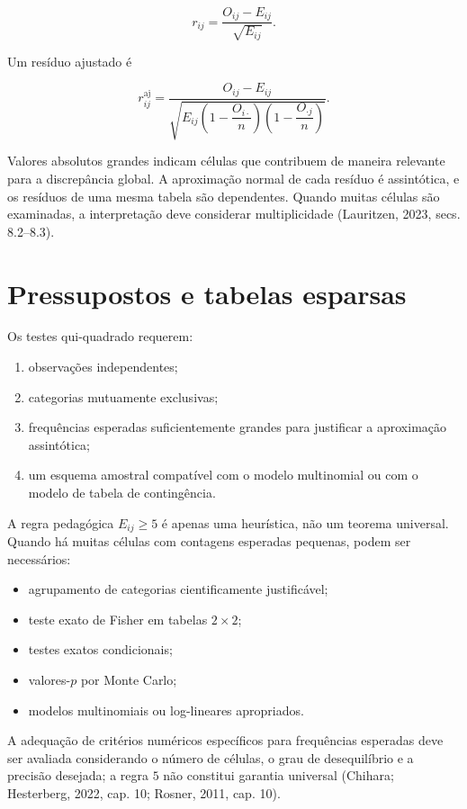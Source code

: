 \documentclass[
  letterpaper,
  DIV=11,
  numbers=noendperiod]{scrreprt}
\providecommand{\tightlist}{%
  \setlength{\itemsep}{0pt}\setlength{\parskip}{0pt}}\usepackage{longtable,booktabs,array}
\begin{document}
\[r_{ij}
=
\frac{O_{ij}-E_{ij}}{\sqrt{E_{ij}}}.\]

Um resíduo ajustado é

\[r_{ij}^{\mathrm{aj}}
=
\frac{O_{ij}-E_{ij}}
{\sqrt{E_{ij}
\left(1-\dfrac{O_{i\cdot}}{n}\right)
\left(1-\dfrac{O_{\cdot j}}{n}\right)}}.\]

Valores absolutos grandes indicam células que contribuem de maneira
relevante para a discrepância global. A aproximação normal de cada
resíduo é assintótica, e os resíduos de uma mesma tabela são
dependentes. Quando muitas células são examinadas, a interpretação deve
considerar multiplicidade (Lauritzen, 2023, secs. 8.2--8.3).

\section{Pressupostos e tabelas
esparsas}\label{pressupostos-e-tabelas-esparsas}

Os testes qui-quadrado requerem:

\begin{enumerate}
\def\labelenumi{\arabic{enumi}.}
\tightlist
\item
  observações independentes;
\item
  categorias mutuamente exclusivas;
\item
  frequências esperadas suficientemente grandes para justificar a
  aproximação assintótica;
\item
  um esquema amostral compatível com o modelo multinomial ou com o
  modelo de tabela de contingência.
\end{enumerate}

A regra pedagógica \(E_{ij}\geq5\) é apenas uma heurística, não um
teorema universal. Quando há muitas células com contagens esperadas
pequenas, podem ser necessários:

\begin{itemize}
\tightlist
\item
  agrupamento de categorias cientificamente justificável;
\item
  teste exato de Fisher em tabelas \(2\times2\);
\item
  testes exatos condicionais;
\item
  valores-\(p\) por Monte Carlo;
\item
  modelos multinomiais ou log-lineares apropriados.
\end{itemize}

A adequação de critérios numéricos específicos para frequências
esperadas deve ser avaliada considerando o número de células, o grau de
desequilíbrio e a precisão desejada; a regra \(5\) não constitui
garantia universal (Chihara; Hesterberg, 2022, cap. 10; Rosner, 2011,
cap. 10).
\end{document}
